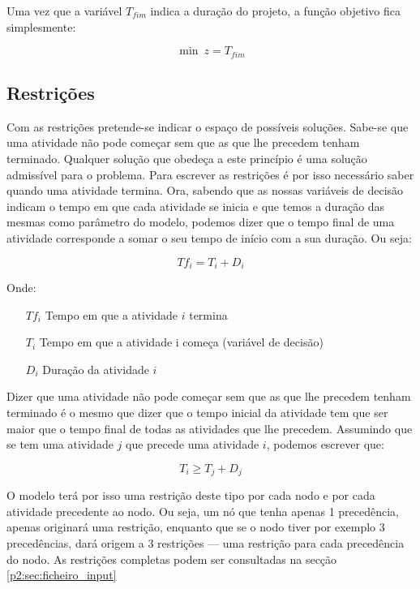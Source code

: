 Uma vez que a variável $T_{fim}$ indica a duração do projeto, a função
objetivo fica simplesmente:

\begin{displaymath} \min~z = T_{fim} \end{displaymath}

\subsection{Restrições}

Com as restrições pretende-se indicar o espaço de possíveis soluções. Sabe-se que uma
atividade não pode começar sem que as que lhe precedem tenham terminado.
Qualquer solução que obedeça a este princípio é uma solução admissível para
o problema. Para escrever as restrições é por isso necessário saber quando uma atividade termina. Ora, sabendo que as nossas variáveis de decisão indicam o tempo em que
cada atividade se inicia e que temos a duração das mesmas como parâmetro do modelo, podemos dizer que o tempo final de uma atividade corresponde a somar o seu tempo de início com a sua duração. Ou seja:

\begin{displaymath} Tf_{i} = T_{i} + D_{i} \end{displaymath}

Onde:

\begin{itemize} \item[$Tf_{i}$] Tempo em que a atividade $i$ termina
		\item[$T_{i}$] Tempo em que a atividade i começa (variável de decisão)
		\item[$D_{i}$] Duração da atividade $i$ \end{itemize}

Dizer que uma atividade não pode começar sem que as que lhe precedem tenham
terminado é o mesmo que dizer que o tempo inicial da atividade tem que ser maior
que o tempo final de todas as atividades que lhe precedem. Assumindo que se tem
uma atividade $j$ que precede uma atividade $i$, podemos escrever que:

\begin{displaymath} T_{i} \geq T_{j} + D_{j} \end{displaymath}

O modelo terá por isso uma restrição deste tipo por cada nodo e por cada
atividade precedente ao nodo. Ou seja, um nó que tenha apenas 1 precedência,
apenas originará uma restrição, enquanto que se o nodo tiver por exemplo
3 precedências, dará origem a 3 restrições --- uma restrição para cada precedência
do nodo. As restrições completas podem ser consultadas na secção \ref{p2:sec:ficheiro_input}


